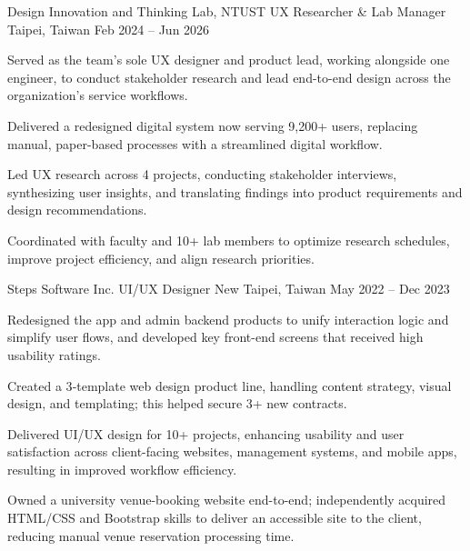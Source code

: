 

\begin{cventries}

  \cventry
    {Design Innovation and Thinking Lab, NTUST} %
    {UX Researcher \& Lab Manager} %
    {Taipei, Taiwan} %
    {Feb 2024 -- Jun 2026} %
    {
      \vspace{-4.0mm}
      \begin{cvitems}
        \item {Served as the team's sole UX designer and product lead, working alongside one engineer, to conduct stakeholder research and lead end-to-end design across the organization's service workflows.}
        \item {Delivered a redesigned digital system now serving 9,200+ users, replacing manual, paper-based processes with a streamlined digital workflow.}
        \item {Led UX research across 4 projects, conducting stakeholder interviews, synthesizing user insights, and translating findings into product requirements and design recommendations.}
        \item {Coordinated with faculty and 10+ lab members to optimize research schedules, improve project efficiency, and align research priorities.}
      \end{cvitems}
    }

  \cventry
    {Steps Software Inc.} %
    {UI/UX Designer} %
    {New Taipei, Taiwan} %
    {May 2022 -- Dec 2023} %
    {
      \vspace{-4.0mm}
      \begin{cvitems} %
        \item {Redesigned the app and admin backend products to unify interaction logic and simplify user flows, and developed key front-end screens that received high usability ratings.}
        \item {Created a 3‑template web design product line, handling content strategy, visual design, and templating; this helped secure 3+ new contracts.}
        \item {Delivered UI/UX design for 10+ projects, enhancing usability and user satisfaction across client-facing websites, management systems, and mobile apps, resulting in improved workflow efficiency.}
        \item {Owned a university venue-booking website end-to-end; independently acquired HTML/CSS and Bootstrap skills to deliver an accessible site to the client, reducing manual venue reservation processing time.}
      \end{cvitems}
    }


\end{cventries}
